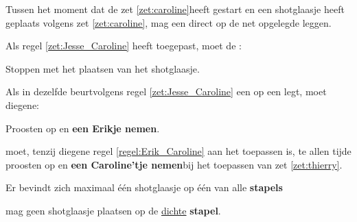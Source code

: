 
\vervolgLijst{}
\item \label{zet:Jesse_Caroline} Tussen het moment dat de \huidigeSpeler zet \ref{zet:caroline}\footnotemark[1] heeft gestart en een shotglaasje heeft geplaats volgens zet \ref{zet:caroline}\footnotemark[1], mag \eenSpeler een \footnotemark[5] direct op de net opgelegde \footnotemark[6] leggen.
\eindLijst{}

\vervolgLijst{}
\item \label{zet:Jesse_Caroline_2} Als \eenSpeler regel \ref{zet:Jesse_Caroline} heeft toegepast, moet de \huidigeSpelerN:
\puntLijst{}
\item Stoppen met het plaatsen van het shotglaasje.
\eindPuntLijst{}
\eindLijst{}

\vervolgLijst{}
\item \label{regel:Erik_Caroline} Als \eenSpeler in dezelfde beurt\footnotemark[7] volgens regel \ref{zet:Jesse_Caroline} een \footnotemark[5] op een \footnotemark[6] legt, moet diegene:
\puntLijst{}
\item Proosten op  en \textbf{een Erikje nemen}\footnotemark[8].
\eindPuntLijst{}
\eindLijst{}

\vervolgLijst{}
\item \label{regel:Erik_Caroline_2} \EenSpeler moet, tenzij diegene regel \ref{regel:Erik_Caroline} aan het toepassen is, te allen tijde proosten op  en \textbf{een Caroline’tje nemen}\footnotemark[8] bij het toepassen van zet \ref{zet:thierry}\footnotemark[1].
\eindLijst{}


\vervolgLijst{}
\item \label{regel:caroline_een_shotglaasje} Er bevindt zich maximaal \'e\'en shotglaasje op \'e\'en van alle \textbf{stapels}
\label{regel:shotglaasje_te_veel}
\eindLijst{}

\vervolgLijst{}
\item \label{regel:caroline_onjuist_plaatsen_1} \EenSpeler mag geen shotglaasje plaatsen op de \ul{dichte} \textbf{stapel}.
\label{regel:shotglaasje_op_dichte_stapel}
\eindLijst{}


